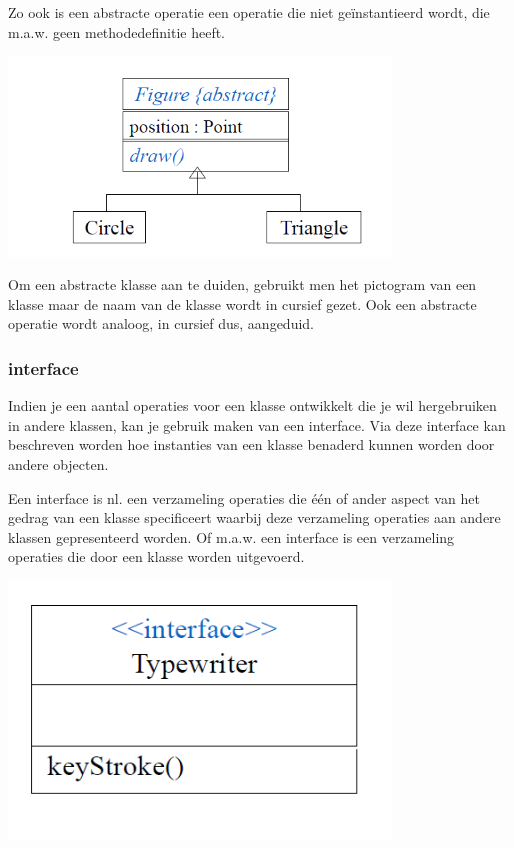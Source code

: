 Zo ook is een abstracte operatie een operatie die niet geïnstantieerd wordt, die m.a.w. geen methodedefinitie heeft.


\begin{center}
\includegraphics[width=4in]{img/abs1}%
\end{center}

Om een abstracte klasse aan te duiden, gebruikt men het pictogram van een klasse maar de naam van de klasse wordt in cursief gezet. Ook een abstracte operatie wordt analoog, in cursief dus, aangeduid.

\subsubsection{interface}

Indien je een aantal operaties voor een klasse ontwikkelt die je wil hergebruiken in andere klassen, kan je gebruik maken van een interface. Via deze interface kan beschreven worden hoe instanties van een klasse benaderd kunnen worden door andere objecten.

Een interface is nl. een verzameling operaties die één of ander aspect van het gedrag van een klasse specificeert waarbij deze verzameling operaties aan andere klassen gepresenteerd worden.
Of m.a.w. een interface is een verzameling operaties die door een klasse worden uitgevoerd.


\begin{center}
\includegraphics[width=4in]{img/int1}%
\end{center}

